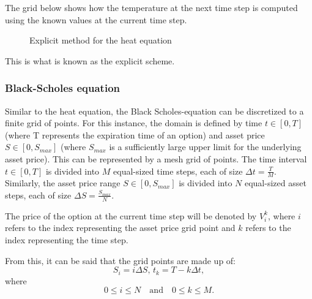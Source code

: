 The grid below shows how the temperature at the next time step is computed using the known values at the current time step.
\begin{figure}[H]
    \centering
    \caption{Explicit method for the heat equation}
    \label{fig:heat-explicit}
\end{figure}

This is what is known as the explicit scheme.

\subsubsection{Black-Scholes equation}
Similar to the heat equation, the Black Scholes-equation can be discretized to a finite grid of points. For this instance, the domain is defined by time $t \in [0, T]$ (where T represents the expiration time of an option) and asset price $S \in [0,S_{max}]$ (where $S_{max}$ is a sufficiently large upper limit for the underlying asset price). This can be represented by a mesh grid of points.
The time interval $t \in [0, T]$ is divided into $M$ equal-sized time steps, each of size ${\Delta t} = \frac{T}{M}$. Similarly, the asset price range $S \in [0,S_{max}]$ is divided into $N$ equal-sized asset steps, each of size ${\Delta S} = \frac{S_{max}}{N}$.

The price of the option at the current time step will be denoted by $V_i^k$, where $i$ refers to the index representing the asset price grid point  
and $k$ refers to the index representing the time step.

From this, it can be said that the grid points are made up of:
\[
S_i = i {\Delta S},\, t_k = T - k {\Delta t},
\]
where
\[
0 \leq i \leq N \quad \text{and} \quad 0 \leq k \leq M.
\]

